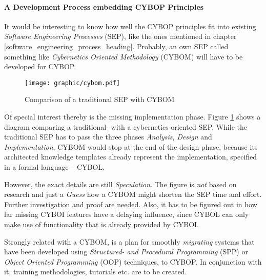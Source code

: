 %
%
%
%
%
%
%

\paragraph{A Development Process embedding CYBOP Principles}
\label{development_process_heading}

It would be interesting to know how well the CYBOP principles fit into existing
\emph{Software Engineering Processes} (SEP), like the ones mentioned in chapter
\ref{software_engineering_process_heading}. Probably, an own SEP called
something like \emph{Cybernetics Oriented Methodology} (CYBOM) will have to be
developed for CYBOP.

\begin{figure}[ht]
    \begin{center}
        \texttt{[image: graphic/cybom.pdf]}
        \caption{Comparison of a traditional SEP with CYBOM}
        \label{cybom_figure}
    \end{center}
\end{figure}

Of special interest thereby is the missing implementation phase. Figure
\ref{cybom_figure} shows a diagram comparing a traditional- with a
cybernetics-oriented SEP. While the traditional SEP has to pass the three
phases \emph{Analysis}, \emph{Design} and \emph{Implementation}, CYBOM would
stop at the end of the design phase, because its architected knowledge
templates already represent the implementation, specified in a formal language
-- CYBOL.

However, the exact details are still \emph{Speculation}. The figure is
\emph{not} based on research and just a \emph{Guess} how a CYBOM might shorten
the SEP time and effort. Further investigation and proof are needed. Also, it
has to be figured out in how far missing CYBOI features have a delaying
influence, since CYBOL can only make use of functionality that is already
provided by CYBOI.

Strongly related with a CYBOM, is a plan for smoothly \emph{migrating} systems
that have been developed using \emph{Structured- and Procedural Programming}
(SPP) or \emph{Object Oriented Programming} (OOP) techniques, to CYBOP. In
conjunction with it, training methodologies, tutorials etc. are to be created.
